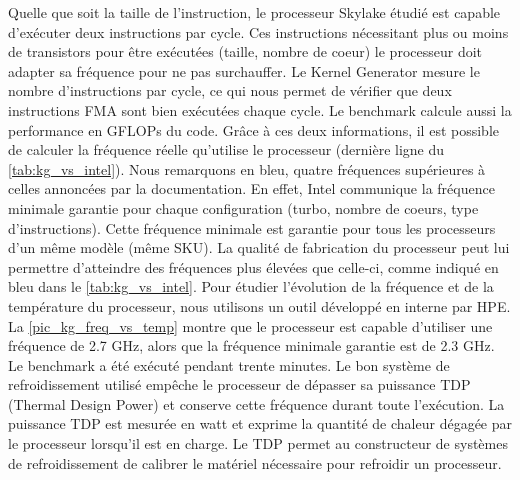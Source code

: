     
    Quelle que soit la taille de l'instruction, le processeur Skylake étudié est capable d'exécuter deux instructions par cycle. Ces instructions nécessitant plus ou moins de transistors pour être exécutées (taille, nombre de coeur) le processeur doit adapter sa fréquence pour ne pas surchauffer.  Le Kernel Generator mesure le nombre d'instructions par cycle, ce qui nous permet de vérifier que deux instructions \gls{FMA} sont bien exécutées chaque cycle. Le benchmark calcule aussi la performance en GFLOPs du code. Grâce à ces deux informations, il est possible de calculer la fréquence réelle qu'utilise le processeur (dernière ligne du  \autoref{tab:kg_vs_intel}). Nous remarquons en bleu, quatre fréquences supérieures à celles annoncées par la documentation. En effet, Intel communique la fréquence minimale garantie pour chaque configuration (turbo, nombre de coeurs, type d'instructions). Cette fréquence minimale est garantie pour tous les processeurs d'un même modèle (même SKU). La qualité de fabrication du processeur peut lui permettre d'atteindre des fréquences plus élevées que celle-ci, comme indiqué en bleu dans le \autoref{tab:kg_vs_intel}. Pour étudier l'évolution de la fréquence et de la température du processeur, nous utilisons un outil développé en interne par HPE. La \autoref{pic_kg_freq_vs_temp} montre que le processeur est capable d'utiliser une fréquence de 2.7 GHz, alors que la fréquence minimale garantie est de 2.3 GHz. Le benchmark a été exécuté pendant trente minutes. Le bon système de refroidissement utilisé empêche le processeur de dépasser sa puissance TDP (Thermal Design Power) et conserve cette fréquence durant toute l'exécution. La puissance TDP est mesurée en watt et exprime la quantité de chaleur dégagée par le processeur lorsqu'il est en charge. Le TDP permet au constructeur de systèmes de refroidissement de calibrer le matériel nécessaire pour refroidir un processeur.  
    
